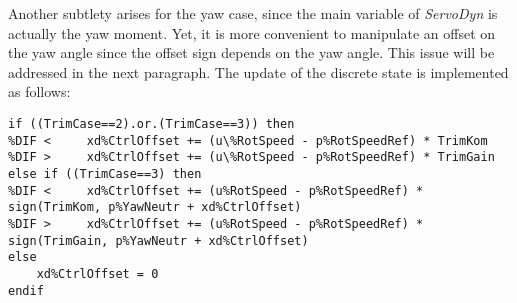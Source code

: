 \documentclass[11pt]{article}
\providecommand{\DIFmodbegin}{} %
\providecommand{\DIFmodend}{} %
\begin{document}
Another subtlety arises for the yaw case, since the main variable of \textit{ServoDyn} is actually the yaw moment. Yet, it is more convenient to manipulate an offset on the yaw angle since the offset sign depends on the yaw angle. 
This issue will be addressed in the next paragraph.
The update of the discrete state is implemented as follows:
\DIFmodbegin
\begin{lstlisting}[alsolanguage=DIFcode]
if ((TrimCase==2).or.(TrimCase==3)) then
%DIF <     xd%CtrlOffset += (u\%RotSpeed - p%RotSpeedRef) * TrimKom 
%DIF >     xd%CtrlOffset += (u\%RotSpeed - p%RotSpeedRef) * TrimGain 
else if ((TrimCase==3) then
%DIF <     xd%CtrlOffset += (u%RotSpeed - p%RotSpeedRef) * sign(TrimKom, p%YawNeutr + xd%CtrlOffset)
%DIF >     xd%CtrlOffset += (u%RotSpeed - p%RotSpeedRef) * sign(TrimGain, p%YawNeutr + xd%CtrlOffset)
else
    xd%CtrlOffset = 0
endif
\end{lstlisting}
\DIFmodend
\end{document}

